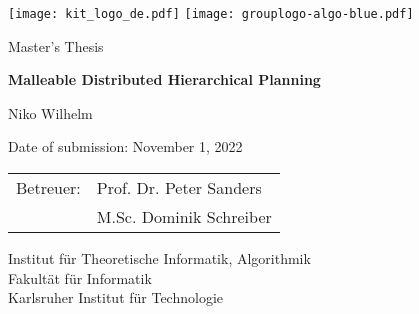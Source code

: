 \documentclass[enabledeprecatedfontcommands,12pt,a4paper,twoside]{scrartcl}
\numberwithin{equation}{section}
\begin{document}

\pagestyle{empty} %

\begin{titlepage}

  \begin{center}\large

    \quad\texttt{[image: kit\_logo\_de.pdf]} \hfill
    \texttt{[image: grouplogo-algo-blue.pdf]}\quad\null

    \vfill

    Master's Thesis
    \vspace*{2cm}

    {\bf\huge Malleable Distributed Hierarchical Planning \par}

    \vfill

    Niko Wilhelm

    \vspace*{15mm}

    Date of submission: November 1, 2022

    \vspace*{45mm}

    \begin{tabular}{rl}
      Betreuer: & Prof. Dr. Peter Sanders \\
      & M.Sc. Dominik Schreiber \\
    \end{tabular}
    
    \vspace*{10mm}

    Institut für Theoretische Informatik, Algorithmik \\
    Fakultät für Informatik \\
    Karlsruher Institut für Technologie


    \vspace*{12mm}
  \end{center}

\end{titlepage}
\end{document}
